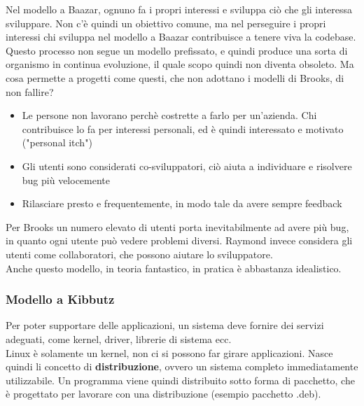\documentclass[a4paper,12pt]{article}
\begin{document}
Nel modello a Baazar, ognuno fa i propri interessi e sviluppa ciò che gli interessa sviluppare. Non c'è quindi un obiettivo comune, ma nel perseguire i propri interessi chi sviluppa nel modello a Baazar contribuisce a tenere viva la codebase. Questo processo non segue un modello prefissato, e quindi produce una sorta di organismo in continua evoluzione, il quale scopo quindi non diventa obsoleto.
Ma cosa permette a progetti come questi, che non adottano i modelli di Brooks, di non fallire?
\begin{itemize}
 \item Le persone non lavorano perchè costrette a farlo per un'azienda. Chi contribuisce lo fa per interessi personali, ed è quindi interessato e motivato ("personal itch")
 \item Gli utenti sono considerati co-sviluppatori, ciò aiuta a individuare e risolvere bug più velocemente
 \item Rilasciare presto e frequentemente, in modo tale da avere sempre feedback
\end{itemize}


Per Brooks un numero elevato di utenti porta inevitabilmente ad avere più bug, in quanto ogni utente può vedere problemi diversi. Raymond invece considera gli utenti come collaboratori, che possono aiutare lo sviluppatore.\\
Anche questo modello, in teoria fantastico, in pratica è abbastanza idealistico.

\subsubsection{Modello a Kibbutz}
Per poter supportare delle applicazioni, un sistema deve fornire dei servizi adeguati, come kernel, driver, librerie di sistema ecc.\\
Linux è solamente un kernel, non ci si possono far girare applicazioni. Nasce quindi li concetto di \textbf{distribuzione}, ovvero un sistema completo immediatamente utilizzabile. Un programma viene quindi distribuito sotto forma di pacchetto, che è progettato per lavorare con una distribuzione (esempio pacchetto .deb).

\end{document}
